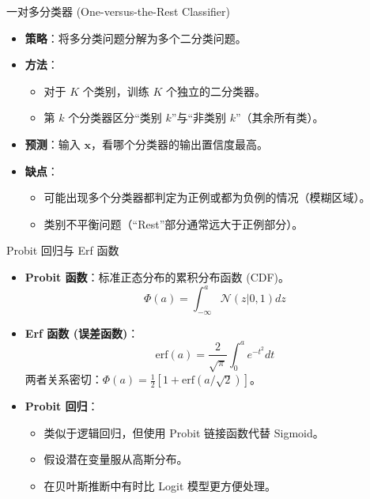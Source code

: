 \documentclass[12pt, aspectratio=169]{beamer}
\newcommand{\vect}[1]{\mathbf{#1}}
\begin{document}
\begin{frame}{一对多分类器 (One-versus-the-Rest Classifier)}
    \begin{itemize}
        \item \textbf{策略}：将多分类问题分解为多个二分类问题。
        \item \textbf{方法}：
        \begin{itemize}
            \item 对于 $K$ 个类别，训练 $K$ 个独立的二分类器。
            \item 第 $k$ 个分类器区分“类别 $k$”与“非类别 $k$”（其余所有类）。
        \end{itemize}
        \item \textbf{预测}：输入 $\vect{x}$，看哪个分类器的输出置信度最高。
        \item \textbf{缺点}：
        \begin{itemize}
            \item 可能出现多个分类器都判定为正例或都为负例的情况（模糊区域）。
            \item 类别不平衡问题（“Rest”部分通常远大于正例部分）。
        \end{itemize}
    \end{itemize}
\end{frame}

\begin{frame}{Probit 回归与 Erf 函数}
    \begin{itemize}
        \item \textbf{Probit 函数}：标准正态分布的累积分布函数 (CDF)。
        $$ \Phi(a) = \int_{-\infty}^a \mathcal{N}(z|0, 1) dz $$
        \item \textbf{Erf 函数 (误差函数)}：
        $$ \text{erf}(a) = \frac{2}{\sqrt{\pi}} \int_0^a e^{-t^2} dt $$
        两者关系密切：$\Phi(a) = \frac{1}{2} [1 + \text{erf}(a/\sqrt{2})]$。
        \item \textbf{Probit 回归}：
        \begin{itemize}
            \item 类似于逻辑回归，但使用 Probit 链接函数代替 Sigmoid。
            \item 假设潜在变量服从高斯分布。
            \item 在贝叶斯推断中有时比 Logit 模型更方便处理。
        \end{itemize}
    \end{itemize}
\end{frame}
\end{document}

